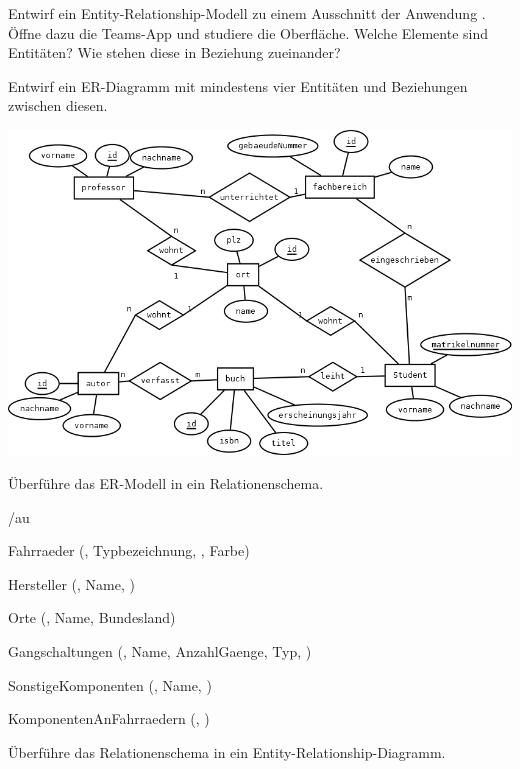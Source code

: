 \documentclass[11pt, a4paper, ngerman]{arbeitsblatt}
\begin{document}
\ReiheTitel

\begin{aufgabe}[subtitle=Entity-Relationship-Modell]
	Entwirf ein Entity-Relationship-Modell zu einem Ausschnitt der Anwendung . Öffne dazu die Teams-App und studiere die Oberfläche. Welche Elemente sind Entitäten? Wie stehen diese in Beziehung zueinander?

	Entwirf ein ER-Diagramm mit mindestens vier Entitäten und Beziehungen zwischen diesen.
\end{aufgabe}

\begin{aufgabe}[subtitle=Relationenschema]
	\begin{center}
		\includegraphics[width=.8\linewidth]{Q2-AB.IV.10-Abb_ERM.png}
	\end{center}

	Überführe das ER-Modell in ein Relationenschema.
\end{aufgabe}/au

\begin{aufgabe}[subtitle=Relationenschema]
	\begin{rahmen}
	\begin{smalldescr}
		\item[Fahrraeder] (, Typbezeichnung, , Farbe)
		\item[Hersteller] (, Name, )
		\item[Orte] (, Name, Bundesland)
		\item[Gangschaltungen] (, Name, AnzahlGaenge, Typ, )
		\item[SonstigeKomponenten] (, Name, )
		\item[KomponentenAnFahrraedern] (, )
	\end{smalldescr}
	\end{rahmen}

	Überführe das Relationenschema in ein Entity-Relationship-Diagramm.
\end{aufgabe}
\end{document}
